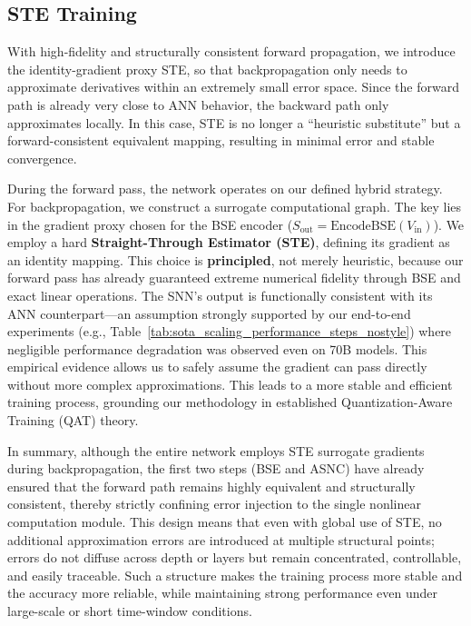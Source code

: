 \documentclass{article}
\theoremstyle{plain}
\theoremstyle{definition}
\theoremstyle{remark}
\begin{document}
\subsection{STE Training}
\label{subsec:ste}

With high-fidelity and structurally consistent forward propagation, we introduce the identity-gradient proxy STE, so that backpropagation only needs to approximate derivatives within an extremely small error space. Since the forward path is already very close to ANN behavior, the backward path only approximates locally. In this case, STE is no longer a ``heuristic substitute'' but a forward-consistent equivalent mapping, resulting in minimal error and stable convergence.

During the forward pass, the network operates on our defined hybrid strategy. For backpropagation, we construct a surrogate computational graph. The key lies in the gradient proxy chosen for the BSE encoder ($S_{\text{out}} = \text{EncodeBSE}(V_{\text{in}})$). We employ a hard \textbf{Straight-Through Estimator (STE)}, defining its gradient as an identity mapping. This choice is \textbf{principled}, not merely heuristic, because our forward pass has already guaranteed extreme numerical fidelity through BSE and exact linear operations. The SNN's output is functionally consistent with its ANN counterpart—an assumption strongly supported by our end-to-end experiments (e.g., Table~\ref{tab:sota_scaling_performance_steps_nostyle}) where negligible performance degradation was observed even on 70B models. This empirical evidence allows us to safely assume the gradient can pass directly without more complex approximations. This leads to a more stable and efficient training process, grounding our methodology in established Quantization-Aware Training (QAT) theory. 

In summary, although the entire network employs STE surrogate gradients during backpropagation, the first two steps (BSE and ASNC) have already ensured that the forward path remains highly equivalent and structurally consistent, thereby strictly confining error injection to the single nonlinear computation module. This design means that even with global use of STE, no additional approximation errors are introduced at multiple structural points; errors do not diffuse across depth or layers but remain concentrated, controllable, and easily traceable. Such a structure makes the training process more stable and the accuracy more reliable, while maintaining strong performance even under large-scale or short time-window conditions.
\end{document}
